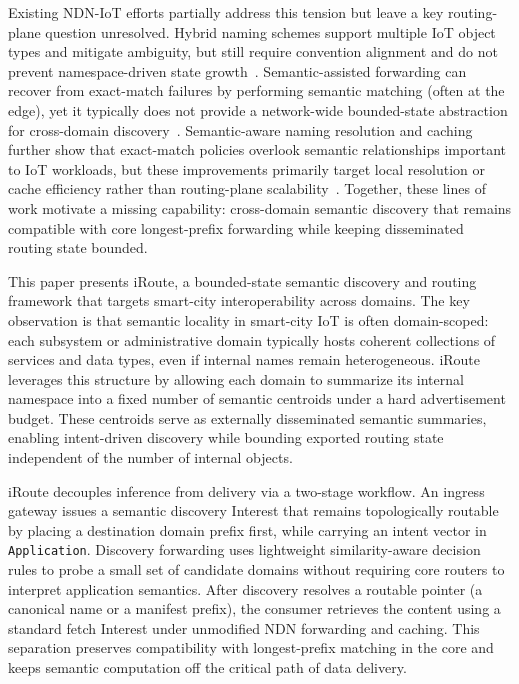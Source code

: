 \documentclass[journal]{IEEEtran}
\newcommand{\sysname}{iRoute}
\newcommand{\AP}{\texttt{Application\allowbreakParameters}}
\begin{document}
Existing NDN-IoT efforts partially address this tension but leave a key routing-plane question unresolved. Hybrid naming schemes support multiple IoT object types and mitigate ambiguity, but still require convention alignment and do not prevent namespace-driven state growth~\cite{hybrid_iot_naming}. Semantic-assisted forwarding can recover from exact-match failures by performing semantic matching (often at the edge), yet it typically does not provide a network-wide bounded-state abstraction for cross-domain discovery~\cite{semantic_name_forwarding_iotmag25}. Semantic-aware naming resolution and caching further show that exact-match policies overlook semantic relationships important to IoT workloads, but these improvements primarily target local resolution or cache efficiency rather than routing-plane scalability~\cite{sanr_cmf}. Together, these lines of work motivate a missing capability: cross-domain semantic discovery that remains compatible with core longest-prefix forwarding while keeping disseminated routing state bounded.

This paper presents \sysname{}, a bounded-state semantic discovery and routing framework that targets smart-city interoperability across domains. The key observation is that semantic locality in smart-city IoT is often domain-scoped: each subsystem or administrative domain typically hosts coherent collections of services and data types, even if internal names remain heterogeneous. \sysname{} leverages this structure by allowing each domain to summarize its internal namespace into a fixed number of semantic centroids under a hard advertisement budget. These centroids serve as externally disseminated semantic summaries, enabling intent-driven discovery while bounding exported routing state independent of the number of internal objects.

\sysname{} decouples inference from delivery via a two-stage workflow. An ingress gateway issues a semantic discovery Interest that remains topologically routable by placing a destination domain prefix first, while carrying an intent vector in \AP. Discovery forwarding uses lightweight similarity-aware decision rules to probe a small set of candidate domains without requiring core routers to interpret application semantics. After discovery resolves a routable pointer (a canonical name or a manifest prefix), the consumer retrieves the content using a standard fetch Interest under unmodified NDN forwarding and caching. This separation preserves compatibility with longest-prefix matching in the core and keeps semantic computation off the critical path of data delivery.
\end{document}
